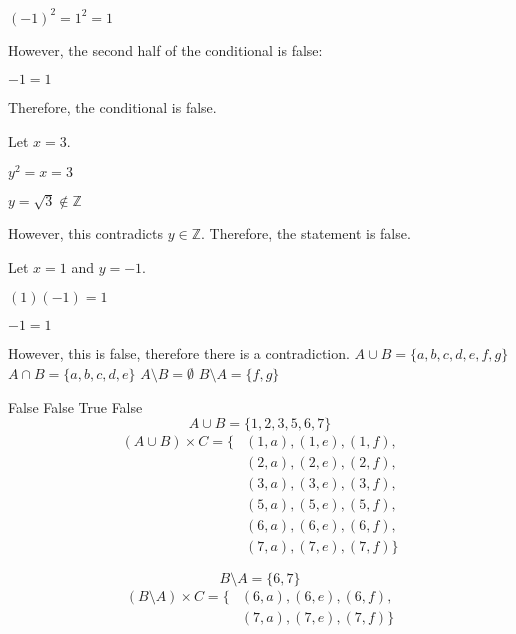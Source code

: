 \documentclass{article}
\begin{document}
\begin{outline}[enumerate]
            \centering 
            $(-1)^2 = 1^2 = 1$

            \raggedright
            However, the second half of the conditional is false:
            
            \centering 
            $-1 = 1$ 
            
            \raggedright
            Therefore, the conditional is false.

        \2 Let $x = 3$. 

            \centering
            $y^2 = x = 3$

            $y = \sqrt{3} \notin \mathbb{Z}$

            \raggedright
            However, this contradicts $y \in \mathbb{Z}$. Therefore, the statement is false.
        
        \2 Let $x = 1$ and $y = -1$.

            \centering
            $(1) (-1) = 1$

            $-1 = 1$

            \raggedright 
            However, this is false, therefore there is a contradiction.
    \1
        \2 $A \cup B = \{ a, b, c, d, e, f, g \}$
        \2 $A \cap B = \{a, b, c, d, e\}$
        \2 $A \setminus B = \emptyset$
        \2 $B \setminus A = \{f, g\}$
    
    \1
        \2 False
        \2 False
        \2 True
        \2 False
    \1
        \2 \begin{equation*}
            A \cup B = \{1, 2, 3, 5, 6, 7\}
        \end{equation*} 
        \begin{equation*}
            \begin{split}
            (A \cup B) \times C = \{ & (1, a), (1, e), (1, f), \\
                & (2, a), (2, e), (2, f), \\
                & (3, a), (3, e), (3, f), \\
                & (5, a), (5, e), (5, f), \\
                & (6, a), (6, e), (6, f), \\
                & (7, a), (7, e), (7, f) \}
            \end{split}
        \end{equation*}

        \2 \begin{equation*}
            B \setminus A = \{6, 7\}
        \end{equation*}
        \begin{equation*} 
            \begin{split}
        (B \setminus A) \times C = \{ & (6, a), (6, e), (6, f), \\
        & (7, a), (7, e), (7, f) \}
            \end{split}
        \end{equation*}


\end{outline}
\end{document}
